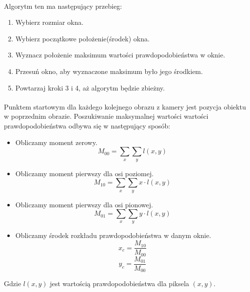 \paragraph*{}
Algorytm ten ma następujący przebieg:
\begin{enumerate}
\item Wybierz rozmiar okna.
\item Wybierz początkowe położenie(środek) okna.
\item Wyznacz położenie maksimum wartości prawdopodobieństwa w oknie.
\item Przesuń okno, aby wyznaczone maksimum było jego środkiem.
\item Powtarzaj kroki 3 i 4, aż algorytm będzie zbieżny.
\end{enumerate}
\paragraph*{}
Punktem startowym dla każdego kolejnego obrazu z kamery jest pozycja obiektu w poprzednim obrazie. Poszukiwanie maksymalnej wartości wartości prawdopodobieństwa odbywa się w następujący sposób:
\begin{itemize}
\item Obliczamy moment zerowy.
\begin{equation}
M_{00}=\sum\limits_{x}\sum\limits_{y}l(x,y)
\end{equation}
\item Obliczamy moment pierwszy dla osi poziomej.
\begin{equation}
M_{10}=\sum\limits_{x}\sum\limits_{y}x \cdot l(x,y)
\end{equation}
\item Obliczamy moment pierwszy dla osi pionowej.
\begin{equation}
M_{01}=\sum\limits_{x}\sum\limits_{y}y \cdot l(x,y)
\end{equation}
\item Obliczamy środek rozkładu prawdopodobieństwa w danym oknie.
\begin{equation}
x_c=\frac{M_{10}}{M_{00}}
\end{equation}
\begin{equation}
y_c=\frac{M_{01}}{M_{00}}
\end{equation}
\end{itemize}
Gdzie \(l(x,y)\) jest wartością prawdopodobieństwa dla piksela \((x,y)\)\cite{BCV}.

